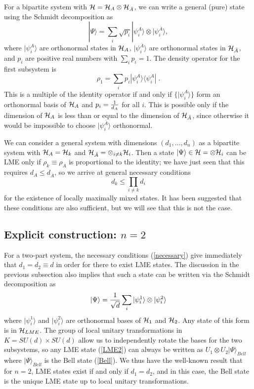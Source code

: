 \documentclass[12pt]{article}
\theoremstyle{definition}
\newcommand{\be}{\begin{equation}}
\newcommand{\ee}{\end{equation}}
\begin{document}
For a bipartite system with ${\cal H} = {\cal H}_A \otimes {\cal H}_{\bar{A}}$, we can write a general (pure) state using the Schmidt decomposition as
\be
|\Psi \rangle = \sum_i \sqrt{p_i} |\psi_i^A \rangle \otimes |\psi_i^{\bar{A}} \rangle,
\ee
where $|\psi_i^A\rangle$ are orthonormal states in ${\cal H}_A$, $|\psi_i^{\bar{A}} \rangle$ are orthonormal states in ${\cal H}_{\bar{A}}$, and $p_i$ are positive real numbers with $\sum_i p_i = 1$. The density operator for the first subsystem is
\be
\rho_1 = \sum_i p_i |\psi_i^A \rangle \langle \psi_i^A| \; .
\ee
This is a multiple of the identity operator if and only if $\{|\psi_i^A \rangle\}$ form an orthonormal basis of ${\cal H}_A$ and $p_i = {1 \over d_A}$ for all $i$. This is possible only if the dimension of ${\cal H}_A$ is less than or equal to the dimension of ${\cal H}_{\bar{A}}$, since otherwise it would be impossible to choose $|\psi_i^{\bar{A}} \rangle$ orthonormal.

We can consider a general system with dimensions $(d_1,\dots, d_n)$ as a bipartite system with ${\cal H}_A = {\cal H}_k$ and ${\cal H}_{\bar{A}} = \otimes_{i \ne k} {\cal H}_i$. Then a state $|\Psi \rangle \in {\cal H} = \otimes {\cal H}_i$ can be LME only if $\rho_k \equiv \rho_A$ is proportional to the identity; we have just seen that this requires $d_A \le d_{\bar{A}}$, so we arrive at general necessary conditions
\be
\label{necessary}
d_k \le \prod_{i \ne k} d_i
\ee
for the existence of locally maximally mixed states. It has been suggested that these conditions are also sufficient, but we will see that this is not the case.

\subsection{Explicit construction: $n=2$}

For a two-part system, the necessary conditions (\ref{necessary}) give
immediately that $d_1 = d_2 \equiv d$ in order for there to exist LME
states. The discussion in the previous subsection also implies that
such a state can be written via the Schmidt decomposition as \be
\label{LME2} |\Psi \rangle = {1 \over \sqrt{d}} \sum_i |\psi_i^1
\rangle \otimes |\psi_i^2 \rangle \ee where $|\psi_i^1 \rangle$ and
$|\psi_i^2 \rangle$ are orthonormal bases of ${\cal H}_1$ and ${\cal
H}_2$. Any state of this form is in ${\cal H}_{LME}$. The group of
local unitary transformations in $K = SU(d) \times SU(d)$ allow us to
independently rotate the bases for the two subsystems, so any LME
state (\ref{LME2}) can always be written as $U_1 \otimes U_2 |\Psi
\rangle_{Bell}$ where $|\Psi \rangle_{Bell}$ is the Bell state
(\ref{Bell}). We thus have the well-known result that for $n=2$, LME
states exist if and only if $d_1 = d_2$, and in this case, the Bell
state is the unique LME state up to local unitary transformations.
\end{document}
